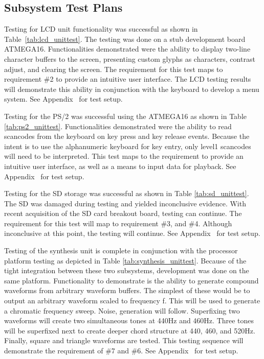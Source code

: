 \documentclass[bibtotocnumbered,abstract=on,paper=a4,fontsize=12pt,parskip=on,halfparskip=on]{scrartcl}		%
\begin{document}
  \subsection{Subsystem Test Plans}

      Testing for LCD unit functionality was successful as shown in Table~\ref{tab:lcd_unittest}. The testing was done on a stub development board ATMEGA16. Functionalities demonstrated were the ability to display two-line character buffers to the screen, presenting custom glyphs as characters, contrast adjust, and clearing the screen. The requirement for this test maps to requirement \#2 to provide an intuitive user interface. The LCD testing results will demonstrate this ability in conjunction with the keyboard to develop a menu system. See Appendix~ for test setup.

      Testing for the PS/2 was successful using the ATMEGA16 as shown in Table \ref{tab:ps2_unittest}. Functionalities demonstrated were the ability to read scancodes from the keyboard on key press and key release events. Because the intent is to use the alphanumeric keyboard for key entry, only level1 scancodes will need to be interpreted. This test maps to the requirement to provide an intuitive user interface, as well as a means to input data for playback. See Appendix~ for test setup.


      Testing for the SD storage was successful as shown in Table \ref{tab:sd_unittest}. The SD was damaged during testing and yielded inconclusive evidence. With recent acquisition of the SD card breakout board, testing can continue. The requirement for this test will map to requirement \#3, and \#4. Although inconclusive at this point, the testing will continue. See Appendix~ for test setup.


Testing of the synthesis unit is complete in conjunction with the processor platform testing as depicted in Table \ref{tab:synthesis_unittest}. Because of the tight integration between these two subsystems, development was done on the same platform. Functionality to demonstrate is the ability to generate compound waveforms from arbitrary waveform buffers. The simplest of these would be to output an arbitrary waveform scaled to frequency f. This will be used to generate a chromatic frequency sweep. Noise, generation will follow. Superfixing two waveforms will create two simultaneous tones at 440Hz and 460Hz. Three tones will be superfixed next to create deeper chord structure at 440, 460, and 520Hz. Finally, square and triangle waveforms are tested. This testing sequence will demonstrate the requirement of \#7 and \#6. See Appendix~ for test setup.
\end{document}
